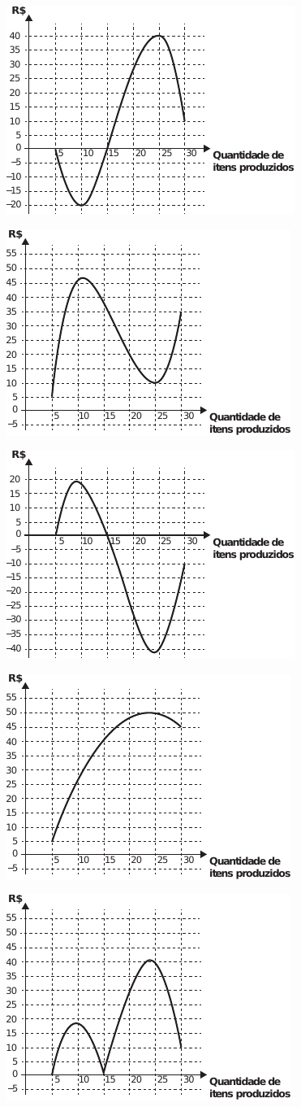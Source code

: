 \begin{alternativas}
\setlength{\columnseprule}{0pt}
\setlength{\columnsep}{6mm}
\begin{multicols}{2}
  \item \parbox{\linewidth}{\includegraphics[width=.35\textwidth]{subareas/matematica/enem_2020-136-A.pdf}}
  \item \parbox{\linewidth}{\includegraphics[width=.35\textwidth]{subareas/matematica/enem_2020-136-D.pdf}}
  \item \parbox{\linewidth}{\includegraphics[width=.35\textwidth]{subareas/matematica/enem_2020-136-B.pdf}}
  \item \parbox{\linewidth}{\includegraphics[width=.35\textwidth]{subareas/matematica/enem_2020-136-E.pdf}}
  \item \parbox{\linewidth}{\includegraphics[width=.35\textwidth]{subareas/matematica/enem_2020-136-C.pdf}}
\end{multicols}
\end{alternativas}


